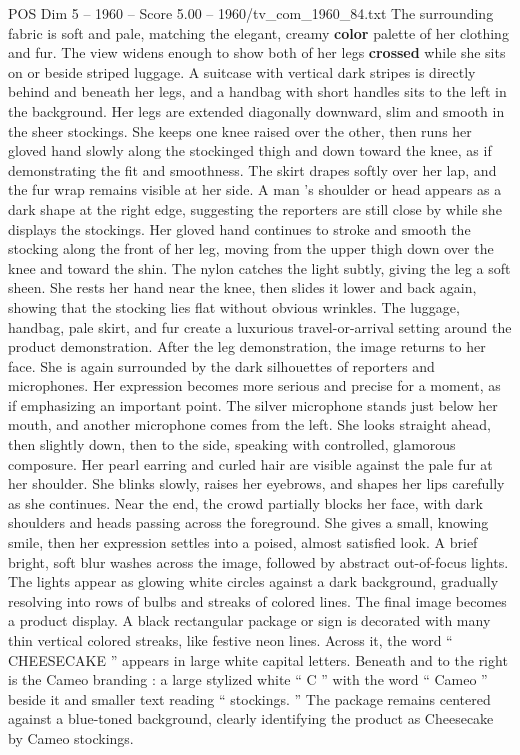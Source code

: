 \begin{textsample}{POS Dim 5 – 1960 – Score 5.00 – 1960/tv\_com\_1960\_84.txt}
The surrounding fabric is soft and pale, matching the elegant, creamy \textbf{color} palette of her clothing and fur.
The view widens enough to show both of her legs \textbf{crossed} while she sits on or beside striped luggage.
A suitcase with vertical dark stripes is directly behind and beneath her legs, and a handbag with short handles sits to the left in the background.
Her legs are extended diagonally downward, slim and smooth in the sheer stockings.
She keeps one knee raised over the other, then runs her gloved hand slowly along the stockinged thigh and down toward the knee, as if demonstrating the fit and smoothness.
The skirt drapes softly over her lap, and the fur wrap remains visible at her side.
A man ’s shoulder or head appears as a dark shape at the right edge, suggesting the reporters are still close by while she displays the stockings.
Her gloved hand continues to stroke and smooth the stocking along the front of her leg, moving from the upper thigh down over the knee and toward the shin.
The nylon catches the light subtly, giving the leg a soft sheen.
She rests her hand near the knee, then slides it lower and back again, showing that the stocking lies flat without obvious wrinkles.
The luggage, handbag, pale skirt, and fur create a luxurious travel-or-arrival setting around the product demonstration.
After the leg demonstration, the image returns to her face.
She is again surrounded by the dark silhouettes of reporters and microphones.
Her expression becomes more serious and precise for a moment, as if emphasizing an important point.
The silver microphone stands just below her mouth, and another microphone comes from the left.
She looks straight ahead, then slightly down, then to the side, speaking with controlled, glamorous composure.
Her pearl earring and curled hair are visible against the pale fur at her shoulder.
She blinks slowly, raises her eyebrows, and shapes her lips carefully as she continues.
Near the end, the crowd partially blocks her face, with dark shoulders and heads passing across the foreground.
She gives a small, knowing smile, then her expression settles into a poised, almost satisfied look.
A brief bright, soft blur washes across the image, followed by abstract out-of-focus lights.
The lights appear as glowing white circles against a dark background, gradually resolving into rows of bulbs and streaks of colored lines.
The final image becomes a product display.
A black rectangular package or sign is decorated with many thin vertical colored streaks, like festive neon lines.
Across it, the word “ CHEESECAKE ” appears in large white capital letters.
Beneath and to the right is the Cameo branding : a large stylized white “ C ” with the word “ Cameo ” beside it and smaller text reading “ stockings. ” The package remains centered against a blue-toned background, clearly identifying the product as Cheesecake by Cameo stockings.

\end{textsample}
